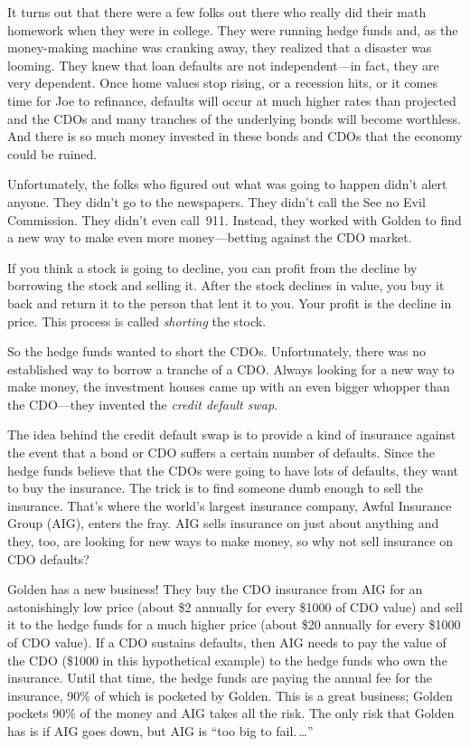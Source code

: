 It turns out that there were a few folks out there who really did
their math homework when they were in college.  They were running
hedge funds and, as the money-making machine was cranking away, they
realized that a disaster was looming.  They knew that loan defaults
are not independent---in fact, they are very dependent.  Once home
values stop rising, or a recession hits, or it comes time for Joe to
refinance, defaults will occur at much higher rates than projected and
the CDOs and many tranches of the underlying bonds will become
worthless.  And there is so much money invested in these bonds and
CDOs that the economy could be ruined.

Unfortunately, the folks who figured out what was going to happen
didn't alert anyone.  They didn't go to the newspapers.  They didn't
call the See no Evil Commission.  They didn't even call~911.  Instead,
they worked with Golden to find a new way to make even more
money---betting against the CDO market.

If you think a stock is going to decline, you can profit from the
decline by borrowing the stock and selling it.  After the stock
declines in value, you buy it back and return it to the person that
lent it to you.  Your profit is the decline in price.  This process is
called \emph{shorting} the stock.

So the hedge funds wanted to short the CDOs.  Unfortunately, there was
no established way to borrow a tranche of a CDO\@.  Always looking for
a new way to make money, the investment houses came up with an even
bigger whopper than the CDO---they invented the \emph{credit default
  swap}.

The idea behind the credit default swap is to provide a kind of
insurance against the event that a bond or CDO suffers a certain
number of defaults.  Since the hedge funds believe that the CDOs were
going to have lots of defaults, they want to buy the insurance.  The
trick is to find someone dumb enough to sell the insurance.  That's
where the world's largest insurance company, Awful Insurance Group
(AIG), enters the fray.  AIG sells insurance on just about anything
and they, too, are looking for new ways to make money, so why not sell
insurance on CDO defaults?

Golden has a new business!  They buy the CDO insurance from AIG for an
astonishingly low price (about \$2 annually for every \$1000 of CDO
value) and sell it to the hedge funds for a much higher price (about
\$20 annually for every \$1000 of CDO value).  If a CDO sustains
defaults, then AIG needs to pay the value of the CDO (\$1000 in this
hypothetical example) to the hedge funds who own the insurance.  Until
that time, the hedge funds are paying the annual fee for the
insurance, 90\% of which is pocketed by Golden.  This is a great
business; Golden pockets 90\% of the money and AIG takes all the risk.
The only risk that Golden has is if AIG goes down, but AIG is ``too
big to fail.\,\ldots''

